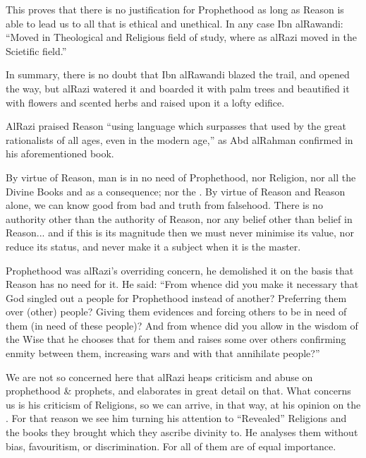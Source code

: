 \documentclass[12pt]{memoir}
\begin{document}

This proves that there is no justification for Prophethood as long as Reason
is able to lead us to all that is ethical and unethical.
In any case Ibn al\–Rawandi:
“Moved in Theological and Religious field of study,
where as al\–Razi moved in the Scietific field.”\fnmark


In summary, there is no doubt that Ibn al\–Rawandi blazed the trail,
and opened the way, but al\–Razi watered it and boarded it with palm trees
and beautified it with flowers and scented herbs
and raised upon it a lofty edifice.

Al\–Razi praised Reason “using language which surpasses that used by the
great rationalists of all ages, even in the modern age,”
as Abd al\–Rahman confirmed in his aforementioned book.

By virtue of Reason, man is in no need of Prophethood, nor Religion,
nor all the Divine Books and as a consequence; nor the \Quran.
By virtue of Reason and Reason alone, we can know good from bad
and truth from falsehood.
There is no authority other than the authority of Reason,
nor any belief other than belief in Reason...
and if this is its magnitude then we must never minimise its value,
nor reduce its status, and never make it a subject when it is the master.

Prophethood was al\–Razi’s overriding concern, he demolished it on the basis
that Reason has no need for it.
He said: “From whence did you make it necessary that God singled out a people
for Prophethood instead of another?
Preferring them over (other) people?
Giving them evidences and forcing others to be in need of them
(in need of these people)?
And from whence did you allow in the wisdom of the Wise that he chooses
that for them and raises some over others confirming enmity between them,
increasing wars and with that annihilate people?”\fnmark


We are not so concerned here that al\–Razi heaps criticism and abuse on
prophethood \& prophets, and elaborates in great detail on that.
What concerns us is his criticism of Religions, so we can arrive,
in that way, at his opinion on the \Quran.
For that reason we see him turning his attention to “Revealed” Religions
and the books they brought which they ascribe divinity to.
He analyses them without bias, favouritism, or discrimination.
For all of them are of equal importance.\fnmark
\end{document}
